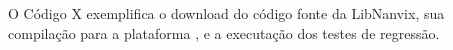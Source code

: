 \label{sec:code-example}

O Código X exemplifica o download do código fonte da LibNanvix, sua compilação para a plataforma \mppa, e
a executação dos testes de regressão.

    

